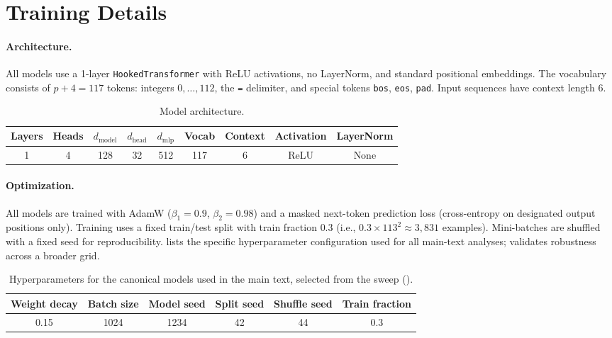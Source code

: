 \documentclass[10pt, letterpaper]{article}
\newcommand{\dmodel}{d_{\text{model}}}
\newcommand{\dmlp}{d_{\text{mlp}}}
\newcommand{\bos}{\texttt{bos}}
\newcommand{\eos}{\texttt{eos}}
\newcommand{\pad}{\texttt{pad}}
\begin{document}



\newpage
\appendix

\section{Training Details}
\label{app:training}

\paragraph{Architecture.} All models use a 1-layer \texttt{HookedTransformer} \citep{nanda2023grokking} with ReLU activations, no LayerNorm, and standard positional embeddings.
The vocabulary consists of $p + 4 = 117$ tokens: integers $0, \ldots, 112$, the \texttt{=} delimiter, and special tokens \bos, \eos, \pad.
Input sequences have context length 6.

\begin{table}[h]
  \centering
  \begin{tabular}{ccccccccc}
    \toprule
    Layers & Heads & $\dmodel$ & $d_{\text{head}}$ & $\dmlp$ & Vocab & Context & Activation & LayerNorm \\
    \midrule
    1 & 4 & 128 & 32 & 512 & 117 & 6 & ReLU & None \\
    \bottomrule
  \end{tabular}
  \caption{Model architecture.}
  \label{tab:architecture}
\end{table}

\paragraph{Optimization.}
All models are trained with AdamW ($\beta_1 = 0.9$, $\beta_2 = 0.98$) and a masked next-token prediction loss (cross-entropy on designated output positions only).
Training uses a fixed train/test split with train fraction $0.3$ (i.e., $0.3 \times 113^2 \approx 3{,}831$ examples).
Mini-batches are shuffled with a fixed seed for reproducibility.
 lists the specific hyperparameter configuration used for all main-text analyses;  validates robustness across a broader grid.

\begin{table}[h]
  \centering
  \begin{tabular}{cccccc}
    \toprule
    Weight decay & Batch size & Model seed & Split seed & Shuffle seed & Train fraction \\
    \midrule
    0.15 & 1024 & 1234 & 42 & 44 & 0.3 \\
    \bottomrule
  \end{tabular}
  \caption{Hyperparameters for the canonical models used in the main text, selected from the sweep ().}
  \label{tab:canonical_hyperparams}
\end{table}
\end{document}
